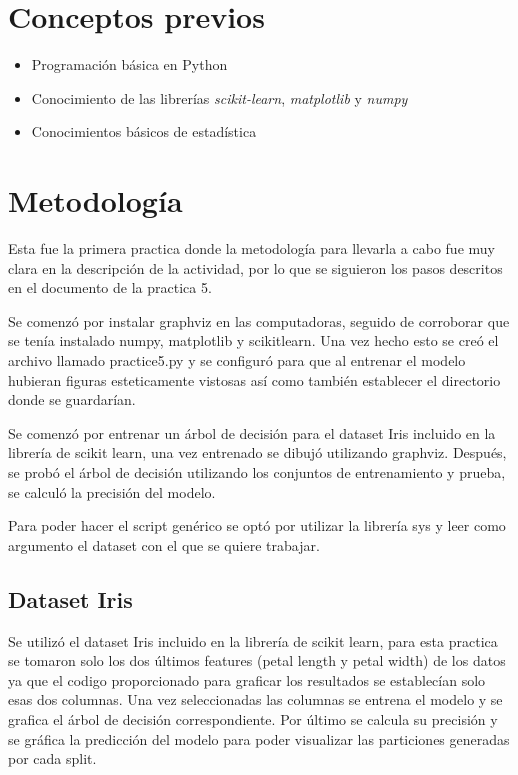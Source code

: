 \documentclass[sigconf,authorversion,nonacm]{acmart}
\begin{document}
\section{Conceptos previos}
\begin{itemize}
  \item Programación básica en Python
  \item Conocimiento de las librerías \textit{scikit-learn}, \textit{matplotlib} y \textit{numpy}
  \item Conocimientos básicos de estadística
\end{itemize}


\section{Metodología}
Esta fue la primera practica donde la metodología para llevarla a cabo fue muy clara en la descripción de la actividad, por lo que se siguieron los pasos descritos en el documento de la practica 5.

Se comenzó por instalar graphviz en las computadoras, seguido de corroborar que se tenía instalado numpy, matplotlib y scikitlearn.
Una vez hecho esto se creó el archivo llamado practice5.py y se configuró para que al entrenar el modelo hubieran figuras esteticamente vistosas así como también establecer el directorio donde se guardarían.

Se comenzó por entrenar un árbol de decisión para el dataset Iris incluido en la librería de scikit learn, una vez entrenado se dibujó utilizando graphviz.
Después, se probó el árbol de decisión utilizando los conjuntos de entrenamiento y prueba, se calculó la precisión del modelo.

Para poder hacer el script genérico se optó por utilizar la librería sys y leer como argumento el dataset con el que se quiere trabajar.

\subsection{Dataset Iris}
Se utilizó el dataset Iris incluido en la librería de scikit learn, para esta practica se tomaron solo los dos últimos features (petal length y petal width) de los datos ya que el codigo proporcionado para graficar los resultados se establecían solo esas dos columnas. 
Una vez seleccionadas las columnas se entrena el modelo y se grafica el árbol de decisión correspondiente.
Por último se calcula su precisión y se gráfica la predicción del modelo para poder visualizar las particiones generadas por cada split.
\end{document}
